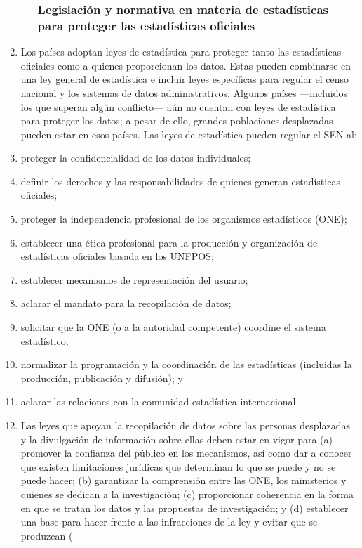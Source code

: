 \documentclass[
]{book}
\begin{document}
\begin{enumerate}
\begin{enumerate}
{    \subsubsection{Legislación y normativa en materia de estadísticas para proteger las estadísticas oficiales}\label{legislaciuxf3n-y-normativa-en-materia-de-estaduxedsticas-para-proteger-las-estaduxedsticas-oficiales}}
  \end{enumerate}
\item
  Los países adoptan leyes de estadística para proteger tanto las estadísticas oficiales como a quienes proporcionan los datos. Estas pueden combinarse en una ley general de estadística e incluir leyes específicas para regular el censo nacional y los sistemas de datos administrativos. Algunos países ---incluidos los que superan algún conflicto--- aún no cuentan con leyes de estadística para proteger los datos; a pesar de ello, grandes poblaciones desplazadas pueden estar en esos países. Las leyes de estadística pueden regular el SEN al:
\item
  proteger la confidencialidad de los datos individuales;
\item
  definir los derechos y las responsabilidades de quienes generan estadísticas oficiales;
\item
  proteger la independencia profesional de los organismos estadísticos (ONE);
\item
  establecer una ética profesional para la producción y organización de estadísticas oficiales basada en los UNFPOS;
\item
  establecer mecanismos de representación del usuario;
\item
  aclarar el mandato para la recopilación de datos;
\item
  solicitar que la ONE (o a la autoridad competente) coordine el sistema estadístico;
\item
  normalizar la programación y la coordinación de las estadísticas (incluidas la producción, publicación y difusión); y
\item
  aclarar las relaciones con la comunidad estadística internacional.
\item
  Las leyes que apoyan la recopilación de datos sobre las personas desplazadas y la divulgación de información sobre ellas deben estar en vigor para (a) promover la confianza del público en los mecanismos, así como dar a conocer que existen limitaciones jurídicas que determinan lo que se puede y no se puede hacer; (b) garantizar la comprensión entre las ONE, los ministerios y quienes se dedican a la investigación; (c) proporcionar coherencia en la forma en que se tratan los datos y las propuestas de investigación; y (d) establecer una base para hacer frente a las infracciones de la ley y evitar que se produzcan (

\end{enumerate}
\end{document}
